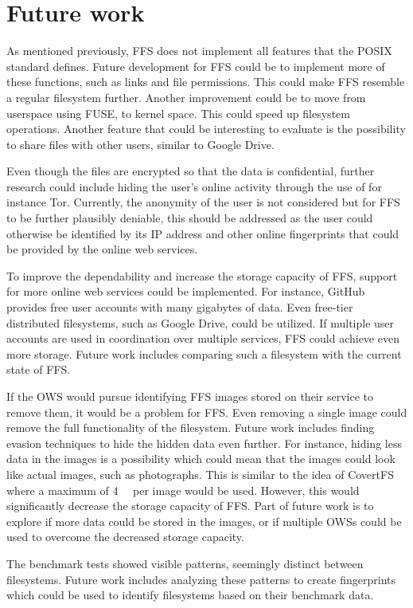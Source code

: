 
\section{Future work}
\label{sec:futureWork}

As mentioned previously, \gls{FFS} does not implement all features that the POSIX standard defines. Future development for \gls{FFS} could be to implement more of these functions, such as links and file permissions. This could make \gls{FFS} resemble a regular filesystem further. Another improvement could be to move from userspace using \gls{FUSE}, to kernel space. This could speed up filesystem operations. Another feature that could be interesting to evaluate is the possibility to share files with other users, similar to Google Drive.

Even though the files are encrypted so that the data is confidential, further research could include hiding the user's online activity through the use of for instance Tor. Currently, the anonymity of the user is not considered but for \gls{FFS} to be further plausibly deniable, this should be addressed as the user could otherwise be identified by its IP address and other online fingerprints that could be provided by the online web services.

To improve the dependability and increase the storage capacity of \gls{FFS}, support for more online web services could be implemented. For instance, GitHub provides free user accounts with many gigabytes of data. Even \mbox{free-tier} distributed filesystems, such as Google Drive, could be utilized. If multiple user accounts are used in coordination over multiple services, \gls{FFS} could achieve even more storage. Future work includes comparing such a filesystem with the current state of \gls{FFS}.

If the \gls{OWS} would pursue identifying \gls{FFS} images stored on their service to remove them, it would be a problem for \gls{FFS}. Even removing a single image could remove the full functionality of the filesystem. Future work includes finding evasion techniques to hide the hidden data even further. For instance, hiding less data in the images is a possibility which could mean that the images could look like actual images, such as photographs. This is similar to the idea of CovertFS\,\cite{baliga2007web} where a maximum of \SI[per-mode = symbol]{4}{\kilo\byte} per image would be used. However, this would significantly decrease the storage capacity of \gls{FFS}. Part of future work is to explore if more data could be stored in the images, or if multiple \gls{OWS}s could be used to overcome the decreased storage capacity. 

The benchmark tests showed visible patterns, seemingly distinct between filesystems. Future work includes analyzing these patterns to create fingerprints which could be used to identify filesystems based on their benchmark data.
